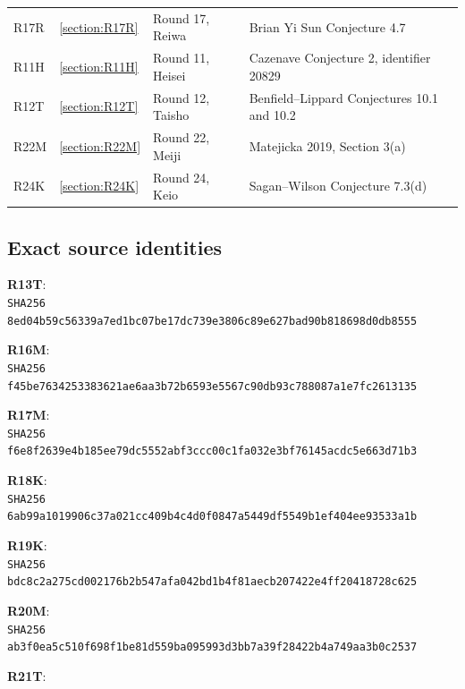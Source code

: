 \documentclass[11pt,a4paper]{article}
\begin{document}
\begin{longtable}{@{}L{.12\textwidth}L{.08\textwidth}L{.19\textwidth}L{.53\textwidth}@{}}
R17R & \ref{section:R17R} & Round 17, Reiwa & Brian Yi Sun Conjecture 4.7\\
R11H & \ref{section:R11H} & Round 11, Heisei & Cazenave Conjecture 2, identifier 20829\\
R12T & \ref{section:R12T} & Round 12, Taisho & Benfield--Lippard Conjectures 10.1 and 10.2\\
R22M & \ref{section:R22M} & Round 22, Meiji & Matejicka 2019, Section 3(a)\\
R24K & \ref{section:R24K} & Round 24, Keio & Sagan--Wilson Conjecture 7.3(d)\\
\bottomrule\end{longtable}
\endgroup
\subsection*{Exact source identities}
\begingroup\scriptsize\setlength{\parindent}{0pt}
\textbf{R13T}: \\
\texttt{SHA256 8ed04b59c56339a7ed1bc07be17dc739\allowbreak e3806c89e627bad90b818698d0db8555}\par\medskip
\textbf{R16M}: \\
\texttt{SHA256 f45be7634253383621ae6aa3b72b6593\allowbreak e5567c90db93c788087a1e7fc2613135}\par\medskip
\textbf{R17M}: \\
\texttt{SHA256 f6e8f2639e4b185ee79dc5552abf3ccc\allowbreak 00c1fa032e3bf76145acdc5e663d71b3}\par\medskip
\textbf{R18K}: \\
\texttt{SHA256 6ab99a1019906c37a021cc409b4c4d0f\allowbreak 0847a5449df5549b1ef404ee93533a1b}\par\medskip
\textbf{R19K}: \\
\texttt{SHA256 bdc8c2a275cd002176b2b547afa042bd\allowbreak 1b4f81aecb207422e4ff20418728c625}\par\medskip
\textbf{R20M}: \\
\texttt{SHA256 ab3f0ea5c510f698f1be81d559ba0959\allowbreak 93d3bb7a39f28422b4a749aa3b0c2537}\par\medskip
\textbf{R21T}: \\
\end{document}
